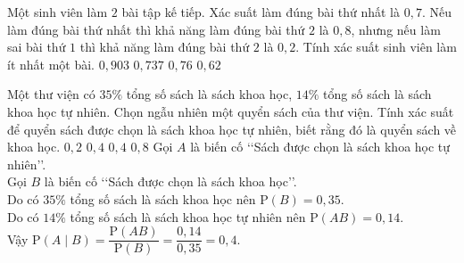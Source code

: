 \begin{ex}%
	Một sinh viên làm $2$ bài tập kế tiếp. Xác suất làm đúng bài thứ nhất là $0{,}7$. Nếu làm đúng bài thứ nhất thì khả năng làm đúng bài thứ $2$ là $0{,}8$, nhưng nếu làm sai bài thứ $1$ thì khả năng làm đúng bài thứ $2$ là $0{,}2$. Tính xác suất sinh viên làm ít nhất một bài.
	\choice
	{$ 0{,}903$}
	{$0{,}737$}
	{\True $0{,}76$}
	{$0{,}62$}
\end{ex}
\begin{ex}%
	Một thư viện có $35\%$ tổng số sách là sách khoa học, $14\%$ tổng số sách là sách khoa học tự nhiên. Chọn ngẫu nhiên một quyển sách của thư viện. Tính xác suất để quyển sách được chọn là sách khoa học tự nhiên, biết rằng đó là quyển sách về khoa học.
	\choice
	{$0{,}2$}
	{\True $0{,}4$}
	{$0,{4}$}
	{$0{,}8$}
	\loigiai
	{Gọi $A$ là biến cố \lq\lq  Sách được chọn là sách khoa học tự nhiên\rq\rq.\\
	Gọi $B$ là biến cố \lq\lq  Sách được chọn là sách khoa học\rq\rq.\\
	Do có $35\%$ tổng số sách là sách khoa học nên $\mathrm{P}(B)=0{,}35$.\\
	Do có $14\%$ tổng số sách là sách khoa học tự nhiên nên $\mathrm{P}(AB)=0{,}14$.\\
	Vậy $\mathrm{P}(A\mid B)=\dfrac{\mathrm{P}(AB)}{\mathrm{P}(B)}=\dfrac{0{,}14}{0{,}35}=0{,}4$.
	}
\end{ex}
